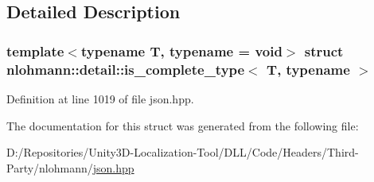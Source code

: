 \subsection{Detailed Description}
\subsubsection*{template$<$typename T, typename = void$>$\newline
struct nlohmann\+::detail\+::is\+\_\+complete\+\_\+type$<$ T, typename $>$}



Definition at line 1019 of file json.\+hpp.



The documentation for this struct was generated from the following file\+:\begin{DoxyCompactItemize}
\item 
D\+:/\+Repositories/\+Unity3\+D-\/\+Localization-\/\+Tool/\+D\+L\+L/\+Code/\+Headers/\+Third-\/\+Party/nlohmann/\mbox{\hyperlink{json_8hpp}{json.\+hpp}}\end{DoxyCompactItemize}
